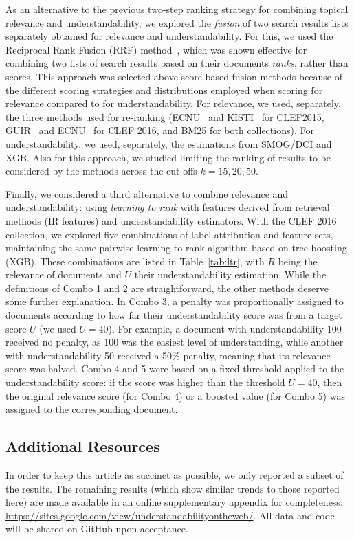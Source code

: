 As an alternative to the previous two-step ranking strategy for combining topical relevance and understandability, we explored the \textit{fusion} of two search results lists separately obtained for relevance and understandability. For this, we used the Reciprocal Rank Fusion (RRF) method~\cite{cormack09}, which was shown effective for combining two lists of search results based on their documents \textit{ranks}, rather than scores. This approach was selected above score-based fusion methods
because of the different scoring strategies and distributions employed when scoring for relevance compared to for understandability. For relevance, we used, separately, the three methods used for re-ranking (ECNU~\cite{song15} and KISTI~\cite{oh15} for CLEF2015, GUIR~\cite{soldaini16} and ECNU~\cite{song16} for CLEF 2016, and BM25 for both collections). For understandability, we used, separately, the estimations from SMOG/DCI and XGB. Also for this approach, we studied limiting the ranking of
results to be considered by the methods across the cut-offs $k=15, 20, 50$. %



Finally, we considered a third alternative to combine relevance and understandability: using \textit{learning to rank} with features derived from retrieval methods (IR features) and understandability estimators.
With the CLEF 2016 collection, we explored five combinations of label attribution and feature sets, maintaining the same pairwise learning to rank algorithm based on tree boosting (XGB).
These combinations are listed in Table~\ref{tab:ltr}, with $R$ being the relevance of documents and $U$ their understandability estimation. While the definitions of Combo 1 and 2 are straightforward, the other methods deserve some further explanation. In Combo 3, a penalty was proportionally assigned to documents according to how far their understandability score was from a target score $U$ (we used $U=40$). For example, a document with understandability 100 received no penalty, as 100 was the easiest level of understanding, while another with understandability 50 received a 50\% penalty, meaning that its relevance score was halved. Combo 4 and 5 were based on a fixed threshold applied to the understandability score: if the score was higher than the threshold $U=40$, then the original relevance score (for Combo 4) or a boosted value (for Combo 5) was assigned to the corresponding document.


\subsection{Additional Resources}
In order to keep this article as succinct as possible, we only reported a subset of the results. The remaining results (which show similar trends to those reported here) are made available in an online supplementary appendix for completeness: \url{https://sites.google.com/view/understandabilityontheweb/}. All data and code will be shared on GitHub upon acceptance.

